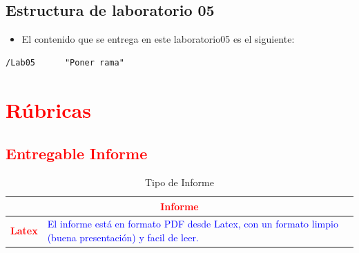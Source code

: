 \documentclass{article}
\begin{document}
	\subsection{Estructura de laboratorio 05}
	\begin{itemize}	
		\item El contenido que se entrega en este laboratorio05 es el siguiente:
	\end{itemize}
	\begin{lstlisting}[style=ascii-tree]
	/Lab05 		"Poner rama"

	\end{lstlisting}    
	\section{\textcolor{red}{Rúbricas}}
	
	\subsection{\textcolor{red}{Entregable Informe}}
	\begin{table}[H]
		\caption{Tipo de Informe}
		\setlength{\tabcolsep}{0.5em} %
		{\renewcommand{\arraystretch}{1.5}%
		\begin{tabular}{|p{3cm}|p{12cm}|}
			\hline
			\multicolumn{2}{|c|}{\textbf{\textcolor{red}{Informe}}}  \\
			\hline 
			\textbf{\textcolor{red}{Latex}} & \textcolor{blue}{El informe está en formato PDF desde Latex,  con un formato limpio (buena presentación) y facil de leer.}   \\ 
			\hline 
			
			
		\end{tabular}
	}
	\end{table}
	
	\clearpage
	
\end{document}
